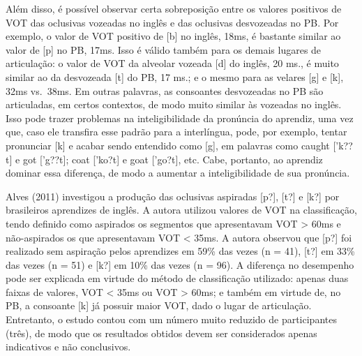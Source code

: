 Al\'em disso, \'e poss\'ivel observar certa sobreposi\c{c}\~ao entre os valores
positivos de VOT das oclusivas vozeadas no ingl\^es e das oclusivas
desvozeadas no PB. Por exemplo, o valor de VOT positivo de {[}b{]} no
ingl\^es, 18ms, \'e bastante similar ao valor de {[}p{]} no PB, 17ms. Isso \'e
v\'alido tamb\'em para os demais lugares de articula\c{c}\~ao: o valor de VOT da
alveolar vozeada {[}d{]} do ingl\^es, 20 ms., \'e muito similar ao da
desvozeada {[}t{]} do PB, 17 ms.; e o mesmo para as velares {[}g{]} e
{[}k{]}, 32ms vs.~38ms. Em outras palavras, as consoantes desvozeadas no
PB s\~ao articuladas, em certos contextos, de modo muito similar às
vozeadas no ingl\^es. Isso pode trazer problemas na inteligibilidade da
pron\'uncia do aprendiz, uma vez que, caso ele transfira esse padr\~ao para
a interl\'ingua, pode, por exemplo, tentar pronunciar {[}k{]} e acabar
sendo entendido como {[}g{]}, em palavras como caught {[}'k??t{]} e got
{[}'g??t{]}; coat {[}'ko?t{]} e goat {[}'go?t{]}, etc. Cabe, portanto,
ao aprendiz dominar essa diferen\c{c}a, de modo a aumentar a
inteligibilidade de sua pron\'uncia.

Alves (2011) investigou a produ\c{c}\~ao das oclusivas aspiradas {[}p?{]},
{[}t?{]} e {[}k?{]} por brasileiros aprendizes de ingl\^es. A autora
utilizou valores de VOT na classifica\c{c}\~ao, tendo definido como aspirados
os segmentos que apresentavam VOT \textgreater{} 60ms e n\~ao-aspirados os
que apresentavam VOT \textless{} 35ms. A autora observou que {[}p?{]}
foi realizado sem aspira\c{c}\~ao pelos aprendizes em 59\% das vezes (n = 41),
{[}t?{]} em 33\% das vezes (n = 51) e {[}k?{]} em 10\% das vezes (n =
96). A diferen\c{c}a no desempenho pode ser explicada em virtude do m\'etodo
de classifica\c{c}\~ao utilizado: apenas duas faixas de valores, VOT
\textless{} 35ms ou VOT \textgreater{} 60ms; e tamb\'em em virtude de, no
PB, a consoante {[}k{]} j\'a possuir maior VOT, dado o lugar de
articula\c{c}\~ao. Entretanto, o estudo contou com um n\'umero muito reduzido de
participantes (tr\^es), de modo que os resultados obtidos devem ser
considerados apenas indicativos e n\~ao conclusivos.

